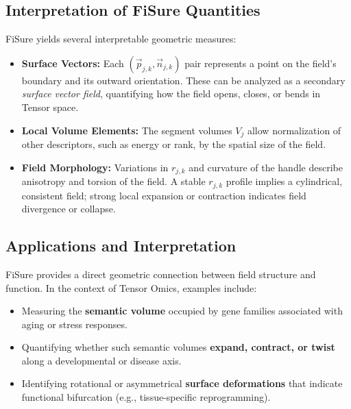 \documentclass{article}
\begin{document}
\subsection{Interpretation of FiSure Quantities}

FiSure yields several interpretable geometric measures:

\begin{itemize}
  \item \textbf{Surface Vectors:}  
  Each \((\vec{p}_{j,k}, \vec{n}_{j,k})\) pair represents a point on the 
  field’s boundary and its outward orientation.  
  These can be analyzed as a secondary \textit{surface vector field}, 
  quantifying how the field opens, closes, or bends in Tensor space.

  \item \textbf{Local Volume Elements:}  
  The segment volumes \(V_j\) allow normalization of other descriptors, 
  such as energy or rank, by the spatial size of the field.

  \item \textbf{Field Morphology:}  
  Variations in \(r_{j,k}\) and curvature of the handle describe 
  anisotropy and torsion of the field.  
  A stable \(r_{j,k}\) profile implies a cylindrical, consistent field; 
  strong local expansion or contraction indicates field divergence or collapse.
\end{itemize}

\subsection{Applications and Interpretation}

FiSure provides a direct geometric connection between 
field structure and function.  
In the context of Tensor Omics, examples include:

\begin{itemize}
  \item Measuring the \textbf{semantic volume} occupied by gene families 
        associated with aging or stress responses.
  \item Quantifying whether such semantic volumes 
        \textbf{expand, contract, or twist} along a 
        developmental or disease axis.
  \item Identifying rotational or asymmetrical \textbf{surface deformations} 
        that indicate functional bifurcation (e.g., 
        tissue-specific reprogramming).
\end{itemize}
\end{document}
